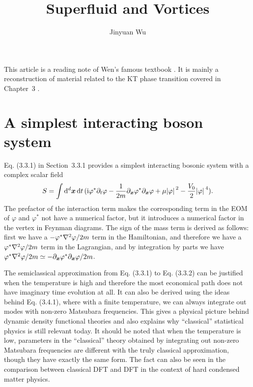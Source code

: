 \documentclass[hyperref, a4paper]{article}
\title{Superfluid and Vortices}
\author{Jinyuan Wu}
\newcommand*{\ii}{\mathrm{i}}
\begin{document}
\maketitle

This article is a reading note of Wen's famous textbook \cite{Wen2007}. 
It is mainly a reconstruction of material related to the KT phase transition covered in Chapter~3 . 

\section{A simplest interacting boson system}

Eq. (3.3.1) in Section~3.3.1 provides a simplest interacting bosonic system with a complex scalar field 
\begin{equation}
    S = \int \dd[d]{\vb*{x}} \dd{t} (\ii \varphi^* \partial_t \varphi - \frac{1}{2m} \partial_{\vb*{x}} \varphi^* \partial_{\vb*{x}} \varphi + \mu \abs*{\varphi}^2 - \frac{V_0}{2} \abs*{\varphi}^4).
    \label{eq:bosonic}
\end{equation}
The prefactor of the interaction term makes the corresponding term in the EOM of $\varphi$ and $\varphi^*$ not 
have a numerical factor, but it introduces a numerical factor in the vertex in Feynman diagrams. The sign of 
the mass term is derived as follows: first we have a $- \varphi^* \laplacian \varphi / 2m$ term in the 
Hamiltonian, and therefore we have a $\varphi^* \laplacian \varphi / 2m$ term in the Lagrangian, and by 
integration by parts we have $\varphi^* \laplacian \varphi / 2m \simeq - \partial_{\vb*{x}} \varphi^* 
\partial_{\vb*{x}} \varphi / 2m$. 

The semiclassical approximation from Eq. (3.3.1) to Eq. (3.3.2) can be justified when the temperature is high 
and therefore the most economical path does not have imaginary time evolution at all. It can also 
be derived using the ideas behind Eq. (3.4.1), where with a finite temperature, we can always integrate 
out modes with non-zero Matsubara frequencies. This gives a physical picture behind dynamic density 
functional theories and also explains why ``classical'' statistical physics is still relevant today.
It should be noted that when the temperature is low, parameters in the ``classical'' theory obtained 
by integrating out non-zero Matsubara frequencies are different with the truly classical approximation,
though they have exactly the same form. The fact can also be seen in the comparison between classical DFT 
and DFT in the context of hard condensed matter physics. 
\end{document}
